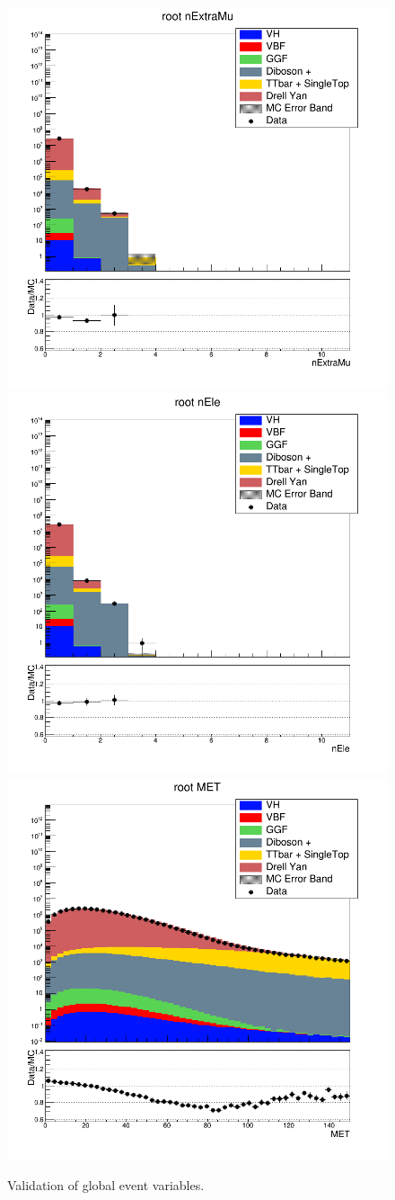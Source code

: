 \begin{figure}[hbp]
  \centering
  \includegraphics[width=0.32\linewidth]{figures/event_sel/nExtraMu_root.png}
  \includegraphics[width=0.32\linewidth]{figures/event_sel/nEle_root.png}
  \includegraphics[width=0.32\linewidth]{figures/event_sel/MET_root.png}
  \caption
   {Validation of global event variables.}
  \label{fig:valid_evt}
\end{figure}

